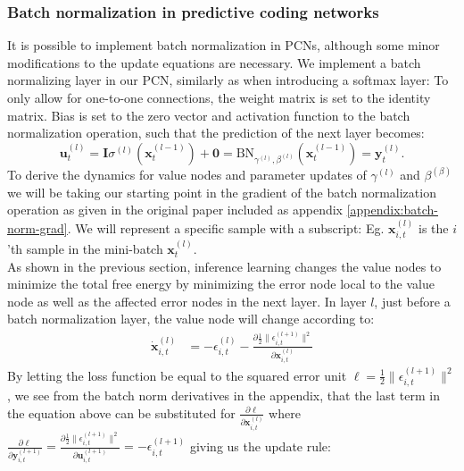 \documentclass[a4paper,11pt]{article} %
\begin{document}
\newpage 

\subsubsection{Batch normalization in predictive coding networks}
It is possible to implement batch normalization in PCNs, although some minor modifications to the update equations are necessary. We implement a batch normalizing layer in our PCN, similarly as when introducing a softmax layer: To only allow for one-to-one connections, the weight matrix is set to the identity matrix. Bias is set to the zero vector and activation function to the batch normalization operation, such that the prediction of the next layer becomes:
\begin{equation}
  \mathbf{u}_{t}^{(l)} = \mathbf{I} \sigma^{(l)}(\mathbf{x}_{t}^{(l-1)}) + \mathbf{0} = \text{BN}_{\gamma^{(l)},\beta^{(l)}}(\mathbf{x}_{t}^{(l-1)}) = \mathbf{y}_t^{(l)}.
\end{equation}
To derive the dynamics for value nodes and parameter updates of $\gamma^{(l)}$ and $\beta^{(\beta)}$ we will be taking our starting point in the gradient of the batch normalization operation as given in the original paper \cite{ioffe2015batch} included as appendix \ref{appendix:batch-norm-grad}. We will represent a specific sample with a subscript: Eg. $\mathbf{x}_{i,t}^{(l)}$ is the $i$'th sample in the mini-batch $\mathbf{x}_{t}^{(l)}$. 
\\
As shown in the previous section, inference learning changes the value nodes to minimize the total free energy by minimizing the error node local to the value node as well as the affected error nodes in the next layer. In layer $l$, just before a batch normalization layer, the value node will change according to:
\begin{equation}
  \begin{split}
    \dot{\mathbf{x}}_{i,t}^{(l)} &= -\epsilon_{i,t}^{(l)} - \frac{\partial \frac{1}{2}\lVert\epsilon_{i,t}^{(l+1)}\rVert^{2}}{ \partial \mathbf{x}_{i,t}^{(l)}}
  \end{split}
\end{equation}
By letting the loss function be equal to the squared error unit $\ell=\frac{1}{2}\lVert\epsilon_{i,t}^{(l+1)}\rVert^{2}$, we see from the batch norm derivatives in the appendix, that the last term in the equation above can be substituted for $\frac{\partial \ell}{\partial \mathbf{x}_{i,t}^{(l)}}$ where $\frac{\partial \ell}{\partial \mathbf{y}_{i,t}^{(l+1)}} = \frac{\partial \frac{1}{2}\lVert\epsilon_{i, t}^{(l+1)}\rVert^{2}}{\partial \mathbf{u}_{i,t}^{(l+1)}} = - \epsilon_{i,t}^{(l+1)}$ giving us the update rule:
\end{document}
